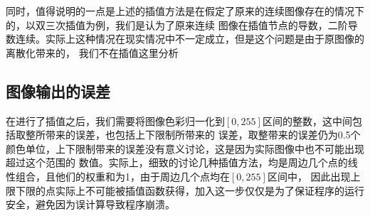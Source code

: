 \documentclass[UTF8,a4paper]{paper}\usepackage[utf8]{inputenc}\usepackage{algorithm}
\begin{document}
同时，值得说明的一点是上述的插值方法是在假定了原来的连续图像存在的情况下的，以双三次插值为例，我们是认为了原来连续
图像在插值节点的导数，二阶导数连续。实际上这种情况在现实情况中不一定成立，但是这个问题是由于原图像的离散化带来的，
我们不在插值这里分析
\subsection{图像输出的误差}
在进行了插值之后，我们需要将图像色彩归一化到$[0,255]$区间的整数，这中间包括取整所带来的误差，也包括上下限制所带来的
误差，取整带来的误差仍为0.5个颜色单位，上下限制带来的误差没有意义讨论，这是因为实际图像中也不可能出现超过这个范围的
数值。实际上，细致的讨论几种插值方法，均是周边几个点的线性组合，且他们的权重和为1，由于周边几个点均在$[0,255]$区间中，
因此出现上限下限的点实际上不可能被插值函数获得，加入这一步仅仅是为了保证程序的运行安全，避免因为误计算导致程序崩溃。
\end{document}
